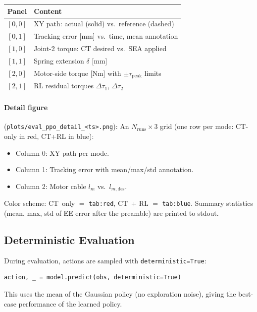 \documentclass[11pt, a4paper]{article}
\begin{document}
\begin{center}
\begin{tabular}{ll}
\toprule
\textbf{Panel} & \textbf{Content} \\
\midrule
$[0,0]$ & XY path: actual (solid) vs.~reference (dashed) \\
$[0,1]$ & Tracking error [mm] vs.~time, mean annotation \\
$[1,0]$ & Joint-2 torque: CT desired vs.~SEA applied \\
$[1,1]$ & Spring extension $\delta$ [mm] \\
$[2,0]$ & Motor-side torque [Nm] with $\pm\tau_{\text{peak}}$ limits \\
$[2,1]$ & RL residual torques $\Delta\tau_1$, $\Delta\tau_2$ \\
\bottomrule
\end{tabular}
\end{center}

\paragraph{Detail figure} (\texttt{plots/eval\_ppo\_detail\_<ts>.png}):
An $N_{\text{runs}} \times 3$ grid (one row per mode: CT-only in red,
CT+RL in blue):

\begin{itemize}[nosep]
  \item Column 0: XY path per mode.
  \item Column 1: Tracking error with mean/max/std annotation.
  \item Column 2: Motor cable $l_m$ vs.~$l_{m,\text{des}}$.
\end{itemize}

Color scheme: CT~only $=$ \texttt{tab:red}, CT~+ RL $=$ \texttt{tab:blue}.
Summary statistics (mean, max, std of EE error after the preamble)
are printed to stdout.

\subsection{Deterministic Evaluation}

During evaluation, actions are sampled with \texttt{deterministic=True}:
\begin{lstlisting}
action, _ = model.predict(obs, deterministic=True)
\end{lstlisting}
This uses the mean of the Gaussian policy (no exploration noise),
giving the best-case performance of the learned policy.
\end{document}
